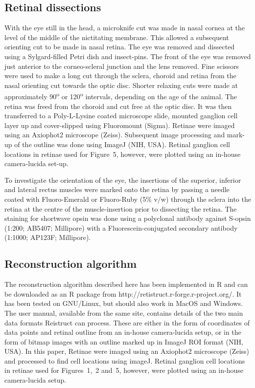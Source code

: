 \documentclass[10pt]{article}
\newcounter{Figure}
\begin{document}
\subsection*{Retinal dissections}
With the eye still in the head, a microknife cut was made in nasal
cornea at the level of the middle of the nictitating membrane.  This
allowed a subsequent orienting cut to be made in nasal retina. The
eye was removed and dissected using a Sylgard-filled Petri dish and
insect-pins. The front of the eye was removed just anterior to the
corneo-scleral junction and the lens removed. Fine scissors were used
to make a long cut through the sclera, choroid and retina from the
nasal orienting cut towards the optic disc. Shorter relaxing cuts
were made at approximately 90\textsuperscript{o} or
120\textsuperscript{o}  intervals, depending on the age of the
animal. The retina was freed from the choroid and cut free at the
optic disc. It was then transferred to a Poly-L-Lysine coated
microscope slide, mounted ganglion cell layer up and cover-slipped
using Fluoromount (Sigma). Retinae were imaged using an Axiophot2
microscope (Zeiss). Subsequent image processing and mark-up of the
outline was done using ImageJ (NIH, USA). Retinal ganglion cell
locations in retinae used for Figure~5, however, were plotted using
an in-house camera-lucida set-up. 

To investigate the orientation of the eye, the insertions of the
superior, inferior and lateral rectus muscles were marked onto the
retina by passing a needle coated with Fluoro-Emerald or Fluoro-Ruby
(5\% v/w) through the sclera into the retina at the centre of the
muscle-insertion prior to dissecting the retina. The staining for
shortwave opsin was done using a polyclonal antibody against S-opsin
(1:200; AB5407; Millipore) with a Fluorescein-conjugated secondary
antibody (1:1000; AP123F; Millipore).

\subsection*{Reconstruction algorithm}
The reconstruction algorithm described here has been implemented in R \cite{R2011} and can be downloaded as an R package from
http://retistruct.r-forge.r-project.org/. It has been tested on
GNU/Linux, but should also work in MacOS and Windows. The user
manual, available from the same site, contains details of the two
main data formats Reistruct can process.  These are either in the
form of coordinates of data points and retinal outline from an
in-house camera-lucida setup, or in the form of bitmap images with an
outline marked up in ImageJ ROI format (NIH, USA).  In this paper,
Retinae were imaged using an Axiophot2 microscope (Zeiss) and
processed to find cell locations using imageJ. Retinal ganglion cell
locations in retinae used for Figures~1,~2 and~5, however, were
plotted using an in-house camera-lucida setup.
\end{document}
